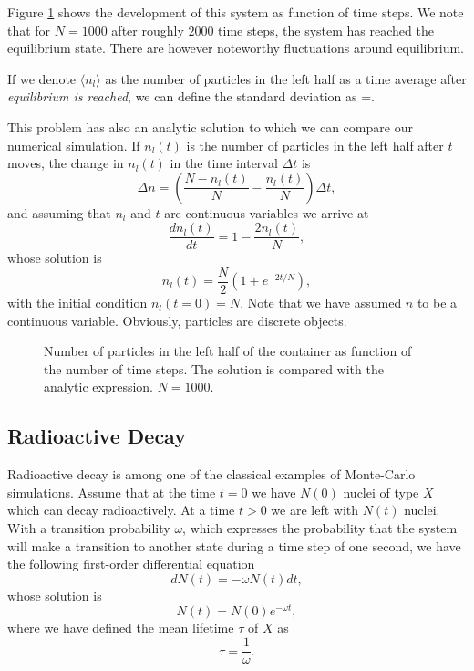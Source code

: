 Figure \ref{fig:particleinabox} shows the development of this system as 
function of time steps. We note that for $N=1000$ 
after roughly $2000$ time steps,
the system has reached the equilibrium state. There are however noteworthy
fluctuations around equilibrium.

If we denote $\langle n_l \rangle $ as the number of particles in the left 
half as a time average after {\em equilibrium is reached}, 
we can define the standard 
deviation as
\be
   \sigma =.
\ee

This problem has also an analytic solution to which we can compare
our numerical simulation.
If $n_l(t)$ is the number of particles in the left half after 
$t$ moves, the change in $n_l(t)$ in the time interval $\Delta t$
is 
\[
    \Delta n=\left(\frac{N-n_l(t)}{N}-\frac{n_l(t)}{N}\right)\Delta t,
\]
and assuming that $n_l$ and $t$ are continuous variables we arrive at
\[
\frac{dn_l(t)}{dt}=1-\frac{2n_l(t)}{N},
\]
whose solution is
\[
   n_l(t)=\frac{N}{2}\left(1+e^{-2t/N}\right),
\]
with the initial condition $n_l(t=0)=N$. Note that we have assumed $n$ to be a continuous variable. Obviously, particles are discrete objects. 
\begin{figure}\label{fig:mcsim1}
\begin{center}

\end{center}
\caption{Number of particles in the left half of the container as function
of the number of time steps. The solution is compared with the analytic expression. $N=1000$.\label{fig:particleinabox}} 
\end{figure}

\subsection{Radioactive Decay}

Radioactive decay is among one of the classical examples of
Monte-Carlo simulations.
Assume that at the time $t=0$ we have $N(0)$ nuclei of type $X$ 
which can decay radioactively. At a time $t>0$ we are left with 
$N(t)$ nuclei. With a transition probability $\omega$, 
which expresses the probability that the system will make a transition to 
another state during a time step of one second, we have the following first-order
differential equation
\[
   dN(t)=-\omega N(t)dt,
\]
whose  solution is
\[
   N(t)=N(0)e^{-\omega t},
\]
where we have defined the mean lifetime $\tau$ of $X$ as
\[
   \tau =\frac{1}{\omega}.
\]

